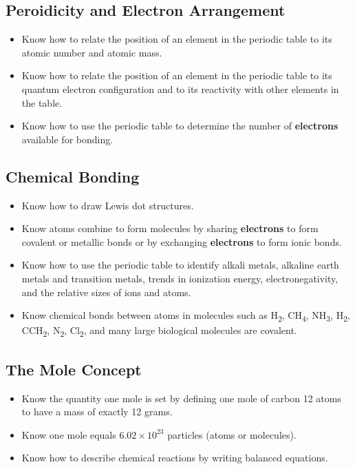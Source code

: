 \documentclass[11pt]{article}
\begin{document}
\subsection{Peroidicity and Electron Arrangement}
\label{sec:orgc3806ab}

\begin{itemize}
\item Know how to relate the position of an element in the periodic table to its atomic number and atomic mass.
\item Know how to relate the position of an element in the periodic table to its quantum electron configuration and to its reactivity with other elements in the table.
\item Know how to use the periodic table to determine the number of \textbf{electrons} available for bonding.
\end{itemize}
\subsection{Chemical Bonding}
\label{sec:org15fea41}

\begin{itemize}
\item Know how to draw Lewis dot structures.
\item Know atoms combine to form molecules by sharing \textbf{electrons} to form covalent or metallic bonds or by exchanging \textbf{electrons} to form ionic bonds.
\item Know how to use the periodic table to identify alkali metals, alkaline earth metals and transition metals, trends in ionization energy, electronegativity, and the relative sizes of ions and atoms.
\item Know chemical bonds between atoms in molecules such as H\textsubscript{2}, CH\textsubscript{4}, NH\textsubscript{3}, H\textsubscript{2}, CCH\textsubscript{2}, N\textsubscript{2}, Cl\textsubscript{2}, and many large biological molecules are covalent.
\end{itemize}
\subsection{The Mole Concept}
\label{sec:orgf1bf3df}

\begin{itemize}
\item Know the quantity one mole is set by defining one mole of carbon 12 atoms to have a mass of exactly 12 grams.
\item Know one mole equals \(6.02 \times 10^{23}\) particles (atoms or molecules).
\item Know how to describe chemical reactions by writing balanced equations.
\end{itemize}
\end{document}
